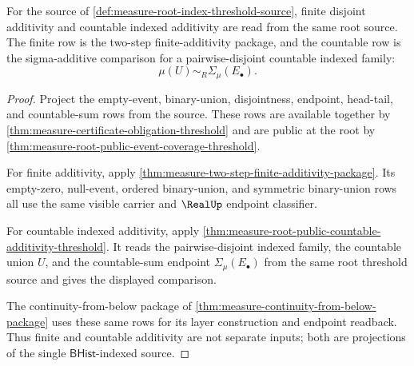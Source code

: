 \begin{theorem}
\label{thm:measure-root-index-additivity-threshold}
For the source of \autoref{def:measure-root-index-threshold-source}, finite
disjoint additivity and countable indexed additivity are read from the same
root source. The finite row is the two-step finite-additivity package, and the
countable row is the sigma-additive comparison for a pairwise-disjoint
countable indexed family:
$$
\mu(U)\sim_R\Sigma_\mu(E_\bullet).
$$
\end{theorem}
\begin{proof}
Project the empty-event, binary-union, disjointness, endpoint, head-tail, and
countable-sum rows from the source. These rows are available together by
\autoref{thm:measure-certificate-obligation-threshold} and are public at the
root by \autoref{thm:measure-root-public-event-coverage-threshold}.

For finite additivity, apply
\autoref{thm:measure-two-step-finite-additivity-package}. Its empty-zero,
null-event, ordered binary-union, and symmetric binary-union rows all use the
same visible carrier and $\RealUp$ endpoint classifier.

For countable indexed additivity, apply
\autoref{thm:measure-root-public-countable-additivity-threshold}. It reads the
pairwise-disjoint indexed family, the countable union $U$, and the
countable-sum endpoint $\Sigma_\mu(E_\bullet)$ from the same root threshold
source and gives the displayed comparison.

The continuity-from-below package of
\autoref{thm:measure-continuity-from-below-package} uses these same rows for
its layer construction and endpoint readback. Thus finite and countable
additivity are not separate inputs; both are projections of the single
$\mathsf{BHist}$-indexed source.
\end{proof}


